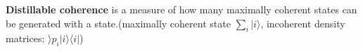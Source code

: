 \documentclass{article}
\begin{document}
\begin{comment}   
Coherences: 
For,
\begin{align}
    |\psi\rangle =a|0\rangle+be^{i\theta}|1\rangle\\
    |\psi'\rangle =e^{i\phi}(a'|0\rangle+b'e^{i\theta'}|1\rangle)\\
\end{align}
in $|\psi\rangle$ there is perfect coherence between $|0\rangle$and $|1\rangle$ (for $\theta$ well defined). Defining $|\phi\rangle=|\psi\rangle+|\phi'\rangle$, with $\theta, \theta', \phi=0$ the probabilities add up classically. But with non-zero phases, they dont. Without coherence between states (ie non-zero controlled phase relations) we loose things like entanglement that make the probabilities non-classical.
\end{comment}

\textbf{Distillable coherence} is a measure of how many maximally coherent states can be generated with a state.(maximally coherent state $\sum_{i}|i\rangle$, incoherent density matrices: $\rangle p_i|i\rangle\langle i|$)
\end{document}
